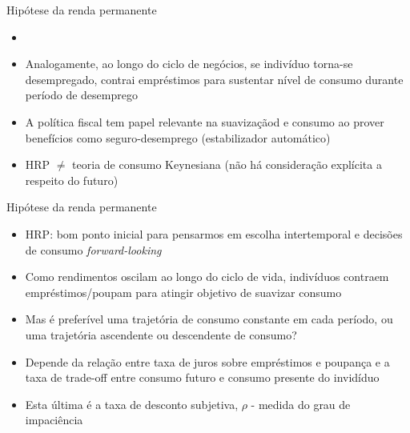 \documentclass[10pt]{beamer}
\begin{document}
\begin{frame}
    {Hipótese da renda permanente}
    \begin{itemize}
        \item {}\bigskip
        \item Analogamente, ao longo do ciclo de negócios, se indivíduo torna-se desempregado, contrai empréstimos para sustentar nível de consumo durante período de desemprego\bigskip
        \item A política fiscal tem papel relevante na suavizaçãod e consumo ao prover benefícios como seguro-desemprego (estabilizador automático)\bigskip
        \item HRP $\neq$ teoria de consumo Keynesiana (não há consideração explícita a respeito do futuro)
    \end{itemize}
\end{frame}

\begin{frame}
    {Hipótese da renda permanente}
    \begin{itemize}
        \item HRP: bom ponto inicial para pensarmos em escolha intertemporal e decisões de consumo \emph{forward-looking}\bigskip
        \item Como rendimentos oscilam ao longo do ciclo de vida, indivíduos contraem empréstimos/poupam para atingir objetivo de suavizar consumo\bigskip
        \item Mas é preferível uma trajetória de consumo constante em cada período, ou uma trajetória ascendente ou descendente de consumo?\bigskip
        \item Depende da relação entre taxa de juros sobre empréstimos e poupança e a taxa de trade-off entre consumo futuro e consumo presente do invidíduo\bigskip
        \item Esta última é a taxa de desconto subjetiva, $\rho$ - medida do grau de impaciência
    \end{itemize}
\end{frame}
\end{document}
